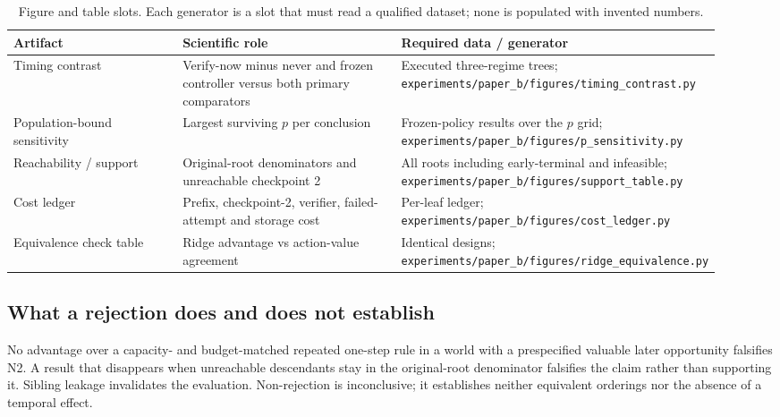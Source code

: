 \begin{table}[t]
\centering
\small
\setlength{\tabcolsep}{4pt}
\begin{tabular}{@{}p{0.26\linewidth}p{0.34\linewidth}p{0.32\linewidth}@{}}
\toprule
Artifact & Scientific role & Required data / generator \\
\midrule
Timing contrast & Verify-now minus never and frozen controller versus both primary comparators & Executed three-regime trees; \texttt{experiments/paper\_b/figures/timing\_contrast.py} \\
Population-bound sensitivity & Largest surviving $p$ per conclusion & Frozen-policy results over the $p$ grid; \texttt{experiments/paper\_b/figures/p\_sensitivity.py} \\
Reachability / support & Original-root denominators and unreachable checkpoint 2 & All roots including early-terminal and infeasible; \texttt{experiments/paper\_b/figures/support\_table.py} \\
Cost ledger & Prefix, checkpoint-2, verifier, failed-attempt and storage cost & Per-leaf ledger; \texttt{experiments/paper\_b/figures/cost\_ledger.py} \\
Equivalence check table & Ridge advantage vs action-value agreement & Identical designs; \texttt{experiments/paper\_b/figures/ridge\_equivalence.py} \\
\bottomrule
\end{tabular}
\caption{Figure and table slots.  Each generator is a slot that must read a
qualified dataset; none is populated with invented numbers.}
\label{tab:b-figure-slots}
\end{table}

\subsection{What a rejection does and does not establish}
\label{sec:b-rejection}

No advantage over a capacity- and budget-matched repeated one-step rule in a
world with a prespecified valuable later opportunity falsifies N2.  A result
that disappears when unreachable descendants stay in the original-root
denominator falsifies the claim rather than supporting it.  Sibling leakage
invalidates the evaluation.  Non-rejection is inconclusive; it establishes
neither equivalent orderings nor the absence of a temporal effect.
